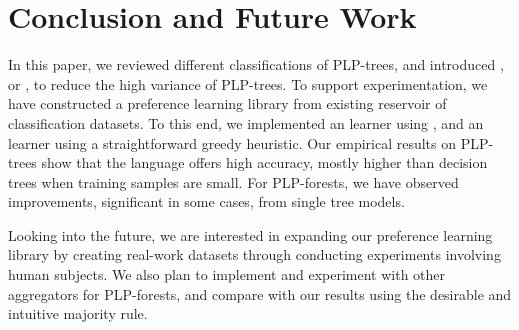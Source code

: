 \section{Conclusion and Future Work}
In this paper, we reviewed different classifications of PLP-trees,
and introduced ,
or , to reduce the high variance of PLP-trees.
To support experimentation, we have constructed a preference
learning library from existing reservoir of classification
datasets.
To this end, we implemented an  learner using
, and an 
learner using a straightforward greedy heuristic.
Our empirical results on PLP-trees show that the language offers
high accuracy, mostly higher than decision trees when training samples
are small.
For PLP-forests, we have observed improvements, significant in some cases,
from single tree models.

Looking into the future, we are interested in expanding our preference
learning library by creating real-work datasets through
conducting experiments involving human subjects.
We also plan to implement and experiment with other aggregators
for PLP-forests, and compare with our results using
the desirable and intuitive majority rule.

